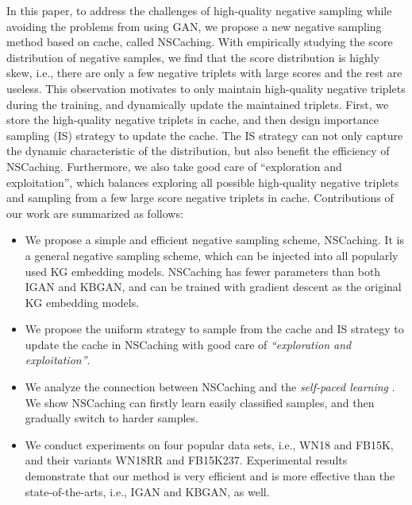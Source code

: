 \documentclass[conference]{IEEEtran}
\begin{document}
In this paper, to address the challenges of high-quality negative sampling 
while avoiding the problems from using GAN, we propose a new negative sampling method based on cache, 
called NSCaching.
With empirically studying the score distribution of negative samples, we find that the score distribution is highly skew,
i.e., there are only a few negative triplets with large scores and the rest are useless.
This observation motivates to only maintain high-quality negative triplets during the training, 
and dynamically update the maintained triplets. 
First, we store the high-quality negative triplets in cache, 
and then design importance sampling (IS) strategy to update the cache.
The IS strategy can not only capture the dynamic characteristic of the distribution, 
but also benefit the efficiency of NSCaching. 
Furthermore, we also take good care of ``exploration and exploitation'',
which balances exploring all possible high-quality negative triplets
and sampling from a few large score negative triplets in cache. 
Contributions of our work are summarized as follows:
\begin{itemize}
	\item We propose a simple and efficient negative sampling scheme, 
	NSCaching. It is a general negative sampling scheme, 
	which can be injected into all popularly used KG embedding models. 
	NSCaching has fewer parameters than both IGAN and KBGAN, 
	and can be trained with gradient descent as the original KG embedding models.
	
	\item We propose the uniform strategy to sample from the cache
	and IS strategy to update the cache in NSCaching 
	with good care of \textit{``exploration and exploitation''}.
	

	\item We analyze the connection between NSCaching and the \textit{self-paced learning} \cite{kumar2010self,bengio2009curriculum}.
	We show NSCaching can firstly learn easily classified samples, 
	and then gradually switch to harder samples.
	
	\item 
We conduct experiments on four popular data sets, i.e.,  WN18 and FB15K, and their variants WN18RR and FB15K237. 
	Experimental results demonstrate that our method is very efficient and is more effective than the state-of-the-arts, 
	i.e., IGAN and KBGAN, as well.
\end{itemize}
\end{document}
